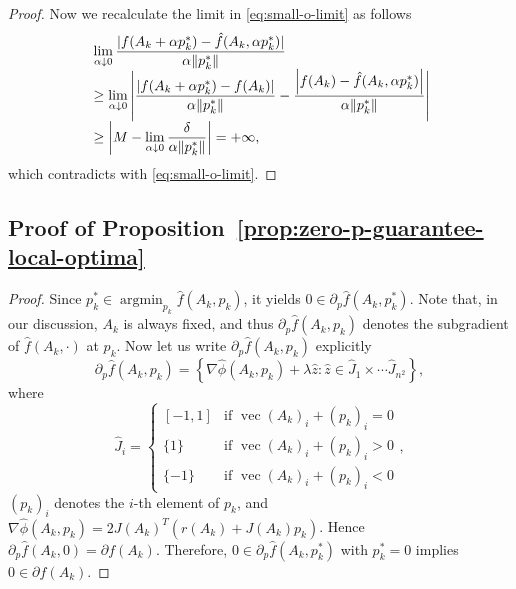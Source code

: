 \documentclass[letterpaper,10pt,journal,final]{IEEEtran}
\theoremstyle{definition}
\theoremstyle{remark}
\newcommand{\kvec}{\operatorname{vec}}
\begin{document}
\begin{proof}
  Now we recalculate the limit in \eqref{eq:small-o-limit} as follows
  \begin{equation*}
    \begin{array}{l@{\;}l}
      &\displaystyle\lim_{\alpha \downarrow 0} \frac{|f(A_k + \alpha p_k^*) - \hat{f}(A_k, \alpha
      p_k^*)|}{\alpha \|p_k^*\|}\\
     &\geq \displaystyle\lim_{\alpha \downarrow 0} \left| \frac{\left|f(A_k + \alpha
        p_k^*) - f(A_k)\right|}{ \alpha \|p_k^*\|} - \frac{\left|f(A_k) -
        \hat{f}(A_k, \alpha p_k^*)\right|}{ \alpha \|p_k^*\|}   \right|\\
      &\geq \displaystyle \left| M - \lim_{\alpha \downarrow 0} \frac{\delta}{\alpha
             \|p_k^*\|}  \right|
      = +\infty,
    \end{array}
  \end{equation*}
  which contradicts with \eqref{eq:small-o-limit}.
\end{proof}


\subsection{Proof of Proposition~\ref{prop:zero-p-guarantee-local-optima}}
\label{appdix:subsec:proof-proposition-zero}

\begin{proof}
  Since $p_k^* \in \operatorname{argmin}_{p_k} \hat{f}(A_k,p_k)$, it yields
  $0 \in \partial_{p} \hat{f}(A_k, p_k^*)$. Note that, in our discussion, $A_k$ is
  always fixed, and thus $\partial_{p} \hat{f}(A_k,p_k)$ denotes the subgradient of
  $\hat{f}(A_k, \cdot)$ at $p_k$. Now let us write $\partial_{p} \hat{f}(A_k,p_k)$
  explicitly
  \begin{equation*}
    \partial_p \hat{f}(A_k,p_k) = \left\{ \nabla \hat{\phi}(A_k,p_k) + \lambda
      \hat{z}: \hat{z} \in \hat{J}_1 \times \cdots \hat{J}_{n^2} \right\},
  \end{equation*}
  where
  \begin{equation*}
    \hat{J}_i =
    \begin{cases}
      [-1,1] & \text{if } \kvec(A_k)_i + (p_k)_i = 0\\
      \{1\}  & \text{if } \kvec(A_k)_i + (p_k)_i > 0\\
      \{-1\} & \text{if } \kvec(A_k)_i + (p_k)_i < 0
    \end{cases},
  \end{equation*}
  $(p_k)_i$ denotes the $i$-th element of $p_k$,
  and
  $\nabla \hat{\phi}(A_k,p_k) = 2 J(A_k)^T \left( r(A_k) + J(A_k) p_k
  \right)$. Hence $\partial_p \hat{f}(A_k, 0) = \partial f(A_k)$.
  Therefore, $0 \in \partial_p\hat{f}(A_k,p_k^*)$ with $p_k^* = 0$ implies $0
  \in \partial f(A_k)$.
\end{proof}
\end{document}

